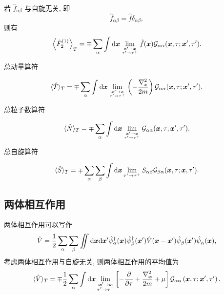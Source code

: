 若 $\hat{f}_{\alpha\beta}$ 与自旋无关, 即
\begin{equation}
\hat{f}_{\alpha\beta}=\hat{f}\delta_{\alpha\beta},
\end{equation}
则有
\begin{equation}
 \left\langle \hat{F}_2^{(1)} \right\rangle_T=\mp\sum_\alpha\int\mathrm{d} \boldsymbol{x}\lim_{\boldsymbol{x}'\to \boldsymbol{x}\atop \tau'\to \tau^+}\hat{f}(\boldsymbol{x}) \mathcal{G}_{\alpha\alpha}(\boldsymbol{x},\tau; \boldsymbol{x}',\tau').
\end{equation}

\begin{example}总动量算符

\begin{equation}
\langle\hat{T}\rangle_T=\mp\sum_\alpha\int\mathrm{d} \boldsymbol{x}\lim_{\boldsymbol{x}'\to \boldsymbol{x}\atop \tau'\to \tau^+}\left(-\frac{\nabla_x^2}{2m}\right) \mathcal{G}_{\alpha\alpha}(\boldsymbol{x},\tau; \boldsymbol{x}',\tau').
\end{equation}
\end{example}

\begin{example}总粒子数算符

\begin{equation}
\langle\hat{N}\rangle_T=\mp\sum_\alpha\int\mathrm{d} \boldsymbol{x}\lim_{\boldsymbol{x}'\to \boldsymbol{x}\atop \tau'\to \tau^+} \mathcal{G}_{\alpha\alpha}(\boldsymbol{x},\tau; \boldsymbol{x}',\tau').
\end{equation}
\end{example}

\begin{example}总自旋算符

\begin{equation}
\langle \hat{S} \rangle_T=\mp\sum_\alpha\sum_\beta\int\mathrm{d} \boldsymbol{x}\lim_{\tau'\to \tau^+}S_{\alpha\beta}\mathcal{G}_{\beta\alpha}(\boldsymbol{x},\tau; \boldsymbol{x},\tau').
\end{equation}
\end{example}

\subsection{两体相互作用}
两体相互作用可以写作
\begin{equation}
\hat{V}=\frac{1}{2}\sum_{\alpha}\sum_\beta\iint\mathrm{d}\boldsymbol{x} \mathrm{d} \boldsymbol{x}' \hat{\psi}_{\alpha}^{\dagger}(\boldsymbol{x}) \hat{\psi}_{\beta}^{\dagger}(\boldsymbol{x}')\hat{V}(\boldsymbol{x}-\boldsymbol{x}')\hat{\psi}_{\beta}^{}(\boldsymbol{x}')\hat{\psi}_{\alpha}^{}(\boldsymbol{x}),
\end{equation}
考虑两体相互作用与自旋无关, 则两体相互作用的平均值为
\begin{equation}
\langle\hat{V}\rangle_T=\mp \frac{1}{2} \sum_\alpha \int \mathrm{d} \boldsymbol{x} \lim _{\substack{\boldsymbol{x}^{\prime} \rightarrow \boldsymbol{x} \\ \tau^{\prime} \rightarrow \tau^{+}}}\left[-\frac{\partial}{\partial \tau}+\frac{\nabla_{\boldsymbol{x}}^2}{2 m}+\mu\right] \mathcal{G}_{\alpha \alpha}\left(\boldsymbol{x}, \tau ; \boldsymbol{x}^{\prime}, \tau^{\prime}\right) .
\end{equation}


